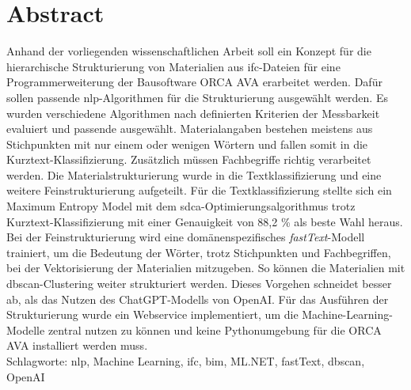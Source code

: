 \chapter*{Abstract}
Anhand der vorliegenden wissenschaftlichen Arbeit soll ein Konzept für die hierarchische Strukturierung von Materialien aus \acf{ifc}-Dateien für eine Programmerweiterung der Bausoftware ORCA AVA erarbeitet werden. Dafür sollen passende \acf{nlp}-Algorithmen für die Strukturierung ausgewählt werden. Es wurden verschiedene Algorithmen nach definierten Kriterien der Messbarkeit evaluiert und passende ausgewählt. Materialangaben bestehen meistens aus Stichpunkten mit nur einem oder wenigen Wörtern und fallen somit in die Kurztext-Klassifizierung. Zusätzlich müssen Fachbegriffe richtig verarbeitet werden. Die Materialstrukturierung wurde in die Textklassifizierung und eine weitere Feinstrukturierung aufgeteilt. Für die Textklassifizierung stellte sich ein Maximum Entropy Model mit dem \ac{sdca}-Optimierungsalgorithmus trotz Kurztext-Klassifizierung mit einer Genauigkeit von 88,2 \% als beste Wahl heraus. Bei der Feinstrukturierung wird eine domänenspezifisches \textit{fastText}-Modell trainiert, um die Bedeutung der Wörter, trotz Stichpunkten und Fachbegriffen, bei der Vektorisierung der Materialien mitzugeben. So können die Materialien mit \acf{dbscan}-Clustering weiter strukturiert werden. Dieses Vorgehen schneidet besser ab, als das Nutzen des ChatGPT-Modells von OpenAI. Für das Ausführen der Strukturierung wurde ein Webservice implementiert, um die Machine-Learning-Modelle zentral nutzen zu können und keine Pythonumgebung für die ORCA AVA installiert werden muss.\\

\noindent Schlagworte: \acs{nlp}, Machine Learning, \acs{ifc}, \acs{bim}, ML.NET, fastText, \acs{dbscan}, OpenAI

